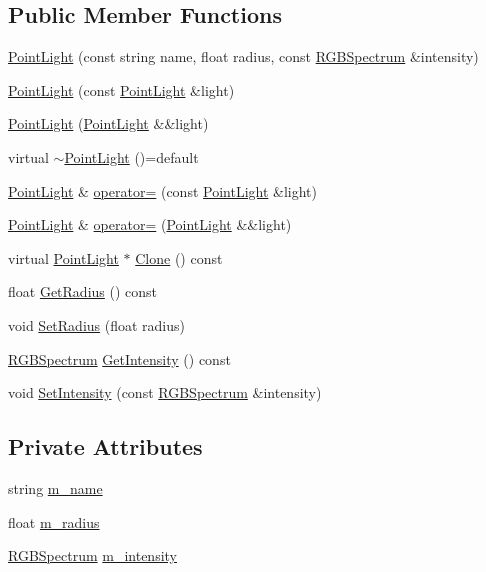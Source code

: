\subsection*{Public Member Functions}
\begin{DoxyCompactItemize}
\item 
\hyperlink{classmage_1_1_point_light_ac9d479055720799816d0489669cbd986}{Point\+Light} (const string name, float radius, const \hyperlink{structmage_1_1_r_g_b_spectrum}{R\+G\+B\+Spectrum} \&intensity)
\item 
\hyperlink{classmage_1_1_point_light_a0b0d5b110f1af47091ae682db7320c62}{Point\+Light} (const \hyperlink{classmage_1_1_point_light}{Point\+Light} \&light)
\item 
\hyperlink{classmage_1_1_point_light_a1268097d15effdebedcedada10a6f56a}{Point\+Light} (\hyperlink{classmage_1_1_point_light}{Point\+Light} \&\&light)
\item 
virtual \hyperlink{classmage_1_1_point_light_ae76fc13ca85717694d55d1a3bb195a98}{$\sim$\+Point\+Light} ()=default
\item 
\hyperlink{classmage_1_1_point_light}{Point\+Light} \& \hyperlink{classmage_1_1_point_light_ae194c7b6e032ddbbf110009348b08c33}{operator=} (const \hyperlink{classmage_1_1_point_light}{Point\+Light} \&light)
\item 
\hyperlink{classmage_1_1_point_light}{Point\+Light} \& \hyperlink{classmage_1_1_point_light_a223e5a389749f63206c57c5cf7107816}{operator=} (\hyperlink{classmage_1_1_point_light}{Point\+Light} \&\&light)
\item 
virtual \hyperlink{classmage_1_1_point_light}{Point\+Light} $\ast$ \hyperlink{classmage_1_1_point_light_a5a685d110af3ec491105147a15df7b87}{Clone} () const
\item 
float \hyperlink{classmage_1_1_point_light_a6321441e96d79caaacf40056beb288f2}{Get\+Radius} () const
\item 
void \hyperlink{classmage_1_1_point_light_ae7b4c301c148bd78348e26e5b6ad8faf}{Set\+Radius} (float radius)
\item 
\hyperlink{structmage_1_1_r_g_b_spectrum}{R\+G\+B\+Spectrum} \hyperlink{classmage_1_1_point_light_aee79741f59d9abebfdd77784c4b29381}{Get\+Intensity} () const
\item 
void \hyperlink{classmage_1_1_point_light_a40c0790159f687fd653a4792f8b39a21}{Set\+Intensity} (const \hyperlink{structmage_1_1_r_g_b_spectrum}{R\+G\+B\+Spectrum} \&intensity)
\end{DoxyCompactItemize}
\subsection*{Private Attributes}
\begin{DoxyCompactItemize}
\item 
string \hyperlink{classmage_1_1_point_light_a96a5802cc2b06df700f63f8e8a9683eb}{m\+\_\+name}
\item 
float \hyperlink{classmage_1_1_point_light_a04459adec2eaadc457799e4399b5df1f}{m\+\_\+radius}
\item 
\hyperlink{structmage_1_1_r_g_b_spectrum}{R\+G\+B\+Spectrum} \hyperlink{classmage_1_1_point_light_ac021a08c4c700c3b19de5f7491a80e4f}{m\+\_\+intensity}
\end{DoxyCompactItemize}
